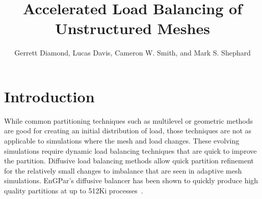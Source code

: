 \documentclass[graybox]{svmult}
\begin{document}
\title*{Accelerated Load Balancing of Unstructured Meshes}
\author{
Gerrett Diamond,
Lucas Davis,
Cameron W. Smith,
and Mark S. Shephard
}

\maketitle


\section{Introduction} \label{sec:intro}


While common partitioning techniques such as multilevel or geometric methods are
good for creating an initial distribution of load, those techniques are not as
applicable  to simulations where the mesh and load changes.
These evolving simulations require dynamic load balancing techniques that are
quick to improve the partition.
Diffusive load balancing methods allow quick partition refinement for the
relatively small changes to imbalance that are seen in adaptive mesh
simulations.
EnGPar's diffusive balancer has been shown to quickly produce high quality
partitions at up to 512Ki processes~\cite{engparSC17}.
\end{document}
